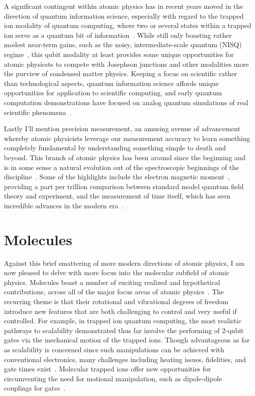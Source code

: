 A significant contingent within atomic physics has in recent years moved in the direction of quantum information science, especially with regard to the trapped ion modality of quantum computing, where two or several states within a trapped ion serve as a quantum bit of information~\cite{Zoller1995,Haffner2008}.
While still only boasting rather modest near-term gains, such as the noisy, intermediate-scale quantum (NISQ) regime~\cite{Preskill2018}, this qubit modality at least provides some unique opportunities for atomic physicsts to compete with Josephson junctions and other modalities more the purview of condensed matter physics.
Keeping a focus on scientific rather than technological aspects, quantum information science affords unique opportunities for application to scientific computing, and early quantum computation demonstrations have focused on analog quantum simulations of real scientific phenomena~\cite{Kassal2008,Lu2011}.

Lastly I'll mention precision measurement, an amusing avenue of advancement whereby atomic physicists leverage our measurement accuracy to learn something completely fundamental by understanding something simple to death and beyond.
This branch of atomic physics has been around since the beginning and is in some sense a natural evolution out of the spectroscopic beginnings of the discipline~\cite{Drake2018}.
Some of the highlights include the electron magnetic moment~\cite{Hanneke2008}, providing a part per trillion comparison between standard model quantum field theory and experiment, and the measurement of time itself, which has seen incredible advances in the modern era~\cite{Bloom2014}.

\section{Molecules}

Against this brief smattering of more modern directions of atomic physics, I am now pleased to delve with more focus into the molecular subfield of atomic physics.
Molecules boast a number of exciting realized and hypothetical contributions, across all of the major focus areas of atomic physics~\cite{Carr2009}.
The recurring theme is that their rotational and vibrational degrees of freedom introduce new features that are both challenging to control and very useful if controlled.
For example, in trapped ion quantum computing, the most realistic pathways to scalability demonstrated thus far involve the performing of 2-qubit gates via the mechanical motion of the trapped ions.
Though advantageous as far as scalability is concerned since such manipulations can be achieved with conventional electronics, many challenges including heating issues, fidelities, and gate times exist~\cite{Bruzewicz2019}.
Molecular trapped ions offer new opportunities for circumventing the need for motional manipulation, such as dipole-dipole couplings for gates~\cite{Schuster2011}.

